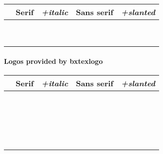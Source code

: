 \documentclass[a4paper]{article}
\newcommand{\Pkg}[1]{\textsf{#1}}
\newenvironment{LogoSamples}{%
  \begin{center}\begin{tabular}{ccccc}
    \hline \phantom{\LARGE I}
        & \textrm{Serif} & \textit{+italic}
        & \textsf{Sans serif} & \textsl{+slanted}
    \\\hline
}{%
    \hline
  \end{tabular}\end{center}
}
\newcommand*{\LSEntry}[1]{%
  \texttt{\string#1} & \textrm{#1} & \textit{#1}
      & \textsf{#1} & \textsf{\textsl{#1}}
  \\}
\begin{document}
\begin{LogoSamples}
\LSEntry{\HanTheThanh}
\LSEntry{\KOMAScript}
\LSEntry{\LaTeXTeX}
\LSEntry{\NTS}
\LSEntry{\PiCTeX}
\LSEntry{\SageTeX}
\LSEntry{\SLiTeX}
\LSEntry{\teTeX}
\LSEntry{\TTH}
\end{LogoSamples}

\paragraph{Logos provided by \Pkg{bxtexlogo}}\mbox{}

\begin{LogoSamples}
\LSEntry{\HeVeA}
\LSEntry{\JBibTeX}
\LSEntry{\JLaTeX}
\LSEntry{\JTeX}
\LSEntry{\KaTeX}
\LSEntry{\KET}
\LSEntry{\KETpic}
\LSEntry{\LaTeXiT}
\LSEntry{\LaTeXML}
\LSEntry{\logoAleph}
\LSEntry{\logoLambda}
\LSEntry{\logoLamed}
\LSEntry{\logoOmega}
\LSEntry{\pTeXsT}
\LSEntry{\XyM}
\LSEntry{\XyMTeX}
\LSEntry{\BaSiX}
\LSEntry{\TeXonLaTeX}
\LSEntry{\OneTeX}
\LSEntry{\SuyahTeX}
\end{LogoSamples}
\end{document}
